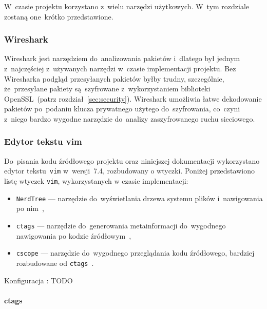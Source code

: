 \documentclass[thesis]{subfiles}
\begin{document}
W~czasie projektu korzystano z~wielu narzędzi użytkowych. W~tym rozdziale zostaną one~krótko przedstawione.


\subsubsection{Wireshark}

Wireshark jest narzędziem do~analizowania pakietów i~dlatego był jednym z~najczęściej z~używanych narzędzi w~czasie implementacji projektu. Bez Wiresharka podgląd przesyłanych pakietów byłby trudny, szczególnie, że~przesyłane pakiety są~szyfrowane z~wykorzystaniem biblioteki OpenSSL~(patrz rozdział~\ref{sec:security}). Wireshark umożliwia łatwe dekodowanie pakietów po~podaniu klucza prywatnego użytego do~szyfrowania, co~czyni z~niego bardzo wygodne narzędzie do~analizy zaszyfrowanego ruchu sieciowego.


\subsubsection{Edytor tekstu vim}

Do~pisania kodu źródłowego projektu oraz niniejszej dokumentacji wykorzystano edytor tekstu~\texttt{vim} w~wersji~7.4, rozbudowany o wtyczki. Poniżej przedstawiono listę wtyczek \texttt{vim}, wykorzystanych w czasie implementacji:
\begin{itemize}
	\item\texttt{NerdTree} --- narzędzie do~wyświetlania drzewa systemu plików i~nawigowania po nim~\cite{nerdtree-vimorg,nerdtree-github},
	\item\texttt{ctags} --- narzędzie do~generowania metainformacji do~wygodnego nawigowania po kodzie źródłowym~\cite{ctags},
	\item\texttt{cscope} --- narzędzie do~wygodnego przeglądania kodu źródłowego, bardziej rozbudowane od \texttt{ctags}~\cite{cscope}.
\end{itemize}

Konfiguracja :
TODO


\paragraph{ctags}
\end{document}
